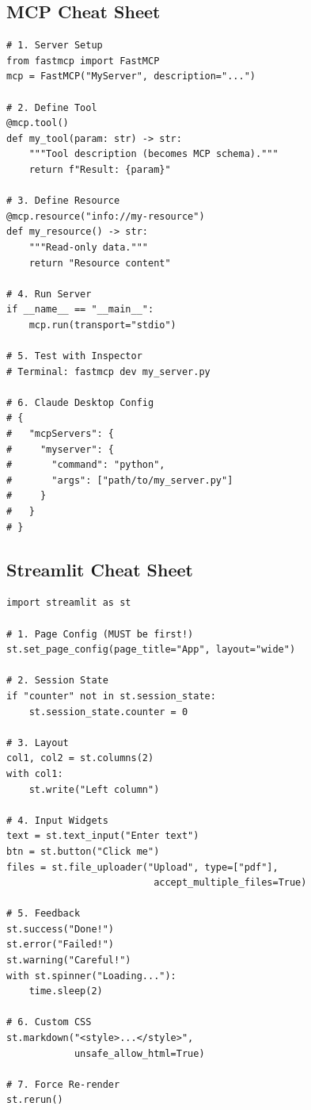 \documentclass[12pt, a4paper]{article}
\begin{document}
\subsection{MCP Cheat Sheet}

\begin{lstlisting}[style=pythonstyle, title={\color{accentgreen}\faIcon{code} MCP Patterns}]
# 1. Server Setup
from fastmcp import FastMCP
mcp = FastMCP("MyServer", description="...")

# 2. Define Tool
@mcp.tool()
def my_tool(param: str) -> str:
    """Tool description (becomes MCP schema)."""
    return f"Result: {param}"

# 3. Define Resource
@mcp.resource("info://my-resource")
def my_resource() -> str:
    """Read-only data."""
    return "Resource content"

# 4. Run Server
if __name__ == "__main__":
    mcp.run(transport="stdio")

# 5. Test with Inspector
# Terminal: fastmcp dev my_server.py

# 6. Claude Desktop Config
# {
#   "mcpServers": {
#     "myserver": {
#       "command": "python",
#       "args": ["path/to/my_server.py"]
#     }
#   }
# }
\end{lstlisting}

\subsection{Streamlit Cheat Sheet}

\begin{lstlisting}[style=pythonstyle, title={\color{accentgreen}\faIcon{code} Streamlit Patterns}]
import streamlit as st

# 1. Page Config (MUST be first!)
st.set_page_config(page_title="App", layout="wide")

# 2. Session State
if "counter" not in st.session_state:
    st.session_state.counter = 0

# 3. Layout
col1, col2 = st.columns(2)
with col1:
    st.write("Left column")

# 4. Input Widgets
text = st.text_input("Enter text")
btn = st.button("Click me")
files = st.file_uploader("Upload", type=["pdf"],
                          accept_multiple_files=True)

# 5. Feedback
st.success("Done!")
st.error("Failed!")
st.warning("Careful!")
with st.spinner("Loading..."):
    time.sleep(2)

# 6. Custom CSS
st.markdown("<style>...</style>",
            unsafe_allow_html=True)

# 7. Force Re-render
st.rerun()
\end{lstlisting}
\end{document}
